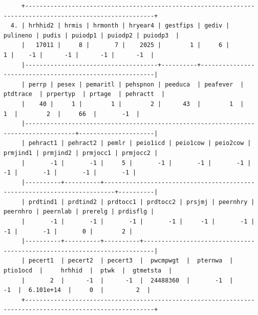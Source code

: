 \documentclass[
]{book}
\begin{document}
\begin{verbatim}
     +----------------------------------------------------------------------------------------------------------+
  4. | hrhhid2 | hrmis | hrmonth | hryear4 | gestfips | gediv | pulineno | pudis | puiodp1 | puiodp2 | puiodp3  |
     |   17011 |     8 |       7 |    2025 |        1 |     6 |        1 |    -1 |      -1 |      -1 |      -1  |
     |-------------------------------------+----------+---------------------------------------------------------|
     | perrp | pesex | pemaritl | pehspnon | peeduca  | peafever  | ptdtrace  | prpertyp  | prtage  | pehractt  |
     |    40 |     1 |        1 |        2 |      43  |        1  |        1  |        2  |     66  |       -1  |
     |------------------------------------------------------------------------------------+---------------------|
     | pehract1 | pehract2 | pemlr | peio1icd | peio1cow | peio2cow | prmjind1 | prmjind2 | prmjocc1 | prmjocc2 |
     |       -1 |       -1 |     5 |       -1 |       -1 |       -1 |       -1 |       -1 |       -1 |       -1 |
     |----------+----------+-------------------------------------------------------------------------+----------|
     | prdtind1 | prdtind2 | prdtocc1 | prdtocc2 | prsjmj | peernhry | peernhro | peernlab | prerelg | prdisflg |
     |       -1 |       -1 |       -1 |       -1 |     -1 |       -1 |       -1 |       -1 |       0 |        2 |
     |----------+----------+----------+-------------------------------------------------------------------------|
     | pecert1  | pecert2  | pecert3  |  pwcmpwgt  |  pternwa  |  ptio1ocd  |     hrhhid  |  ptwk  |  gtmetsta  |
     |       2  |      -1  |      -1  |  24488360  |       -1  |        -1  |  6.101e+14  |     0  |         2  |
     +----------------------------------------------------------------------------------------------------------+


\end{verbatim}
\end{document}
